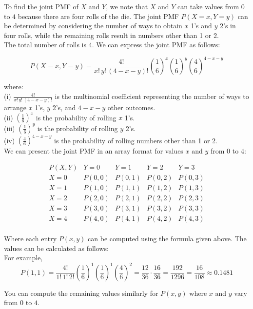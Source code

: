\begin{solution}
To find the joint PMF of \(X\) and \(Y\), we note that \(X\) and \(Y\) can take values from \(0\) to \(4\) because there are four rolls of the die. The joint PMF \(P(X = x, Y = y)\) can be determined by considering the number of ways to obtain \(x\) 1's and \(y\) 2's in four rolls, while the remaining rolls result in numbers other than 1 or 2.\\

The total number of rolls is \(4\). We can express the joint PMF as follows:

\[
P(X = x, Y = y) = \frac{4!}{x! \, y! \, (4 - x - y)!} \left( \frac{1}{6} \right)^x \left( \frac{1}{6} \right)^y \left( \frac{4}{6} \right)^{4 - x - y}
\]

where:\\
(i) \( \frac{4!}{x! \, y! \, (4 - x - y)!} \) is the multinomial coefficient representing the number of ways to arrange \(x\) 1's, \(y\) 2's, and \(4 - x - y\) other outcomes.\\
(ii) \( \left( \frac{1}{6} \right)^x \) is the probability of rolling \(x\) 1's.\\
(iii) \( \left( \frac{1}{6} \right)^y \) is the probability of rolling \(y\) 2's.\\
(iv) \( \left( \frac{4}{6} \right)^{4 - x - y} \) is the probability of rolling numbers other than 1 or 2.\\

We can present the joint PMF in an array format for values \(x\) and \(y\) from \(0\) to \(4\):

\[
\begin{array}{c|cccc}
P(X,Y) & Y=0 & Y=1 & Y=2 & Y=3 \\
\hline
X=0 & P(0,0) & P(0,1) & P(0,2) & P(0,3) \\
X=1 & P(1,0) & P(1,1) & P(1,2) & P(1,3) \\
X=2 & P(2,0) & P(2,1) & P(2,2) & P(2,3) \\
X=3 & P(3,0) & P(3,1) & P(3,2) & P(3,3) \\
X=4 & P(4,0) & P(4,1) & P(4,2) & P(4,3) \\
\end{array}
\]

Where each entry \(P(x,y)\) can be computed using the formula given above. The values can be calculated as follows:\\

For example,
\[
P(1,1) = \frac{4!}{1! \, 1! \, 2!} \left( \frac{1}{6} \right)^1 \left( \frac{1}{6} \right)^1 \left( \frac{4}{6} \right)^{2} = \frac{12}{36} \cdot \frac{16}{36} = \frac{192}{1296} = \frac{16}{108} \approx 0.1481
\]

You can compute the remaining values similarly for \(P(x,y)\) where \(x\) and \(y\) vary from \(0\) to \(4\).
\end{solution}

